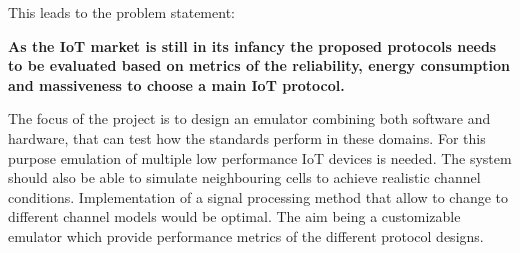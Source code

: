 This leads to the problem statement:
\begin{center}
\textbf{As the IoT market is still in its infancy the proposed protocols needs to be evaluated based on metrics of the reliability, energy consumption and massiveness to choose a main IoT protocol.}
\end{center}

%

The focus of the project is to design an emulator combining both software and hardware, that can test how the standards perform in these domains. For this purpose emulation of multiple low performance \gls{IoT} devices is needed. The system should also be able to simulate neighbouring cells to achieve realistic channel conditions. Implementation of a signal processing method that allow to change to different channel models would be optimal. The aim being a customizable emulator which provide performance metrics of the different protocol designs.

